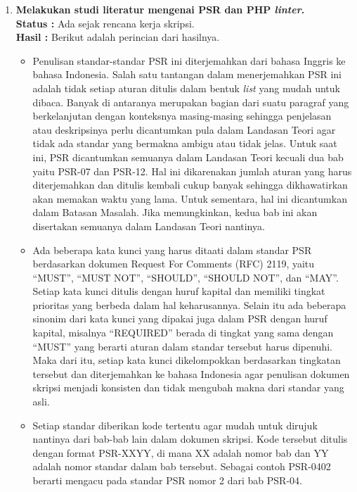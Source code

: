 \documentclass[a4paper,twoside]{article}
\begin{document}
\begin{enumerate}
		\item \textbf{Melakukan studi literatur mengenai PSR dan PHP \textit{linter}.}\\
		{\bf Status :} Ada sejak rencana kerja skripsi.\\
		{\bf Hasil :} Berikut adalah perincian dari hasilnya.
		\begin{itemize}
			\item Penulisan standar-standar PSR ini diterjemahkan dari bahasa Inggris ke bahasa Indonesia. Salah satu tantangan dalam menerjemahkan PSR ini adalah tidak setiap aturan ditulis dalam bentuk \textit{list} yang mudah untuk dibaca. Banyak di antaranya merupakan bagian dari suatu paragraf yang berkelanjutan dengan konteksnya masing-masing sehingga penjelasan atau deskripsinya perlu dicantumkan pula dalam Landasan Teori agar tidak ada standar yang bermakna ambigu atau tidak jelas. Untuk saat ini, PSR dicantumkan semuanya dalam Landasan Teori kecuali dua bab yaitu PSR-07 dan PSR-12. Hal ini dikarenakan jumlah aturan yang harus diterjemahkan dan ditulis kembali cukup banyak sehingga dikhawatirkan akan memakan waktu yang lama. Untuk sementara, hal ini dicantumkan dalam Batasan Masalah. Jika memungkinkan, kedua bab ini akan disertakan semuanya dalam Landasan Teori nantinya.
			\item Ada beberapa kata kunci yang harus ditaati dalam standar PSR berdasarkan dokumen Request For Comments (RFC) 2119, yaitu ``MUST'', ``MUST NOT'', ``SHOULD'', ``SHOULD NOT'', dan ``MAY''. Setiap kata kunci ditulis dengan huruf kapital dan memiliki tingkat prioritas yang berbeda dalam hal keharusannya. Selain itu ada beberapa sinonim dari kata kunci yang dipakai juga dalam PSR dengan huruf kapital, misalnya ``REQUIRED'' berada di tingkat yang sama dengan ``MUST'' yang berarti aturan dalam standar tersebut harus dipenuhi. Maka dari itu, setiap kata kunci dikelompokkan berdasarkan tingkatan tersebut dan diterjemahkan ke bahasa Indonesia agar penulisan dokumen skripsi menjadi konsisten dan tidak mengubah makna dari standar yang asli.  
			\item Setiap standar diberikan kode tertentu agar mudah untuk dirujuk nantinya dari bab-bab lain dalam dokumen skripsi. Kode tersebut ditulis dengan format PSR-XXYY, di mana XX adalah nomor bab dan YY adalah nomor standar dalam bab tersebut. Sebagai contoh PSR-0402 berarti mengacu pada standar PSR nomor 2 dari bab PSR-04. 

\end{itemize}
\end{enumerate}
\end{document}

